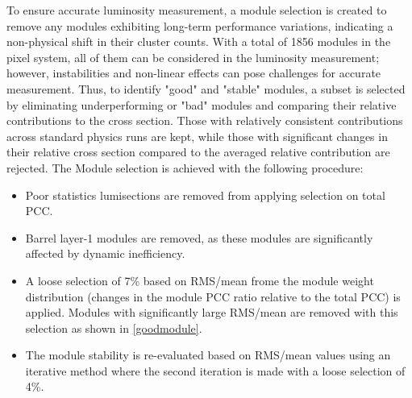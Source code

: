 To ensure accurate luminosity measurement, a module selection is created to remove any modules exhibiting long-term performance variations, indicating a non-physical shift in their cluster counts. With a total of 1856 modules in the pixel system, all of them can be considered in the luminosity measurement; however, instabilities and non-linear effects can pose challenges for accurate measurement. Thus, to identify "good" and "stable" modules, a subset is selected by eliminating  underperforming or "bad" modules and comparing their relative contributions to the cross section. Those with relatively consistent contributions across standard physics runs are kept, while those with significant changes in their relative cross section compared to the averaged relative contribution are rejected. The Module selection is achieved  with the following procedure:

\begin{itemize}
\item Poor statistics lumisections are removed from applying selection on total PCC.
\item Barrel layer-1 modules are removed, as these modules are significantly affected by dynamic inefficiency.
\item A loose selection of 7\% based on RMS/mean frome the module weight distribution (changes in the module PCC ratio relative to the total PCC) is applied. Modules with significantly large RMS/mean are removed with this selection as shown in \ref{goodmodule}.
\item The module stability is re-evaluated based on RMS/mean values using an iterative method where the second iteration is made with a loose selection of 4\%.
\end{itemize}

